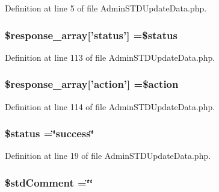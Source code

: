 Definition at line 5 of file Admin\-S\-T\-D\-Update\-Data.\-php.

\hypertarget{_admin_s_t_d_update_data_8php_acd0903a7a32e8397aefd0ce8b7dbd1ab}{
\subsubsection[{\$response\-\_\-array}]{\setlength{\rightskip}{0pt plus 5cm}\$response\-\_\-array\mbox{[}'status'\mbox{]} =\$status}}\label{_admin_s_t_d_update_data_8php_acd0903a7a32e8397aefd0ce8b7dbd1ab}


Definition at line 113 of file Admin\-S\-T\-D\-Update\-Data.\-php.

\hypertarget{_admin_s_t_d_update_data_8php_ae768978a0cdc416c0d63d798c85c8784}{
\subsubsection[{\$response\-\_\-array}]{\setlength{\rightskip}{0pt plus 5cm}\$response\-\_\-array\mbox{[}'action'\mbox{]} =\$action}}\label{_admin_s_t_d_update_data_8php_ae768978a0cdc416c0d63d798c85c8784}


Definition at line 114 of file Admin\-S\-T\-D\-Update\-Data.\-php.

\hypertarget{_admin_s_t_d_update_data_8php_a58391ea75f2d29d5d708d7050b641c33}{
\subsubsection[{\$status}]{\setlength{\rightskip}{0pt plus 5cm}\$status =\char`\"{}success\char`\"{}}}\label{_admin_s_t_d_update_data_8php_a58391ea75f2d29d5d708d7050b641c33}


Definition at line 19 of file Admin\-S\-T\-D\-Update\-Data.\-php.

\hypertarget{_admin_s_t_d_update_data_8php_a57ad1d0043a566efde8a4fb592d52b18}{
\subsubsection[{\$std\-Comment}]{\setlength{\rightskip}{0pt plus 5cm}\$std\-Comment =\char`\"{}\char`\"{}}}\label{_admin_s_t_d_update_data_8php_a57ad1d0043a566efde8a4fb592d52b18}


